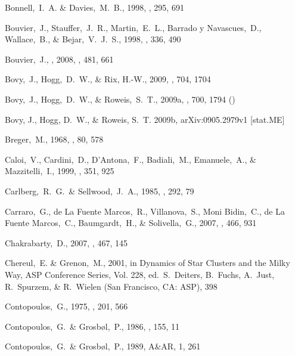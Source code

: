 \begin{thebibliography}{99}
  Bonnell,~I.~A. \& Davies,~M.~B., 1998,
  \mnras, 295, 691

  Bouvier,~J., Stauffer,~J.~R., Martin,~E.~L., Barrado y Navascues,~D., Wallace,~B., \& Bejar,~V.~J.~S., 1998,
  \aap, 336, 490

  Bouvier,~J., \etal, 2008,
  \aap, 481, 661

  Bovy,~J., Hogg,~D.~W., \& Rix, H.-W., 2009,
  \apj, 704, 1704

 Bovy,~J., Hogg,~D.~W.,
  \& Roweis,~S.~T., 2009a, \apj, 700, 1794 (\bhr)

{Bovy}, J., {Hogg}, D.~W., \& {Roweis}, S.~T. 2009b, {arXiv:0905.2979v1
[stat.ME]}

  Breger,~M., 1968, \pasp, 80, 578

  Caloi,~V., Cardini,~D., D'Antona,~F., Badiali,~M., Emanuele,~A., \& Mazzitelli,~I., 1999,
  \aap, 351, 925

  Carlberg,~R.~G.~\& Sellwood,~J.~A., 1985,
  \apj, 292, 79

  Carraro,~G., de La Fuente Marcos,~R., Villanova,~S., Moni Bidin,~C., de La Fuente Marcos,~C., Baumgardt,~H., \& Solivella,~G., 2007,
  \aap, 466, 931

  Chakrabarty,~D., 2007,
  \aap, 467, 145

  Chereul,~E. \& Grenon,~M., 2001, in Dynamics of Star Clusters and the
  Milky Way, ASP Conference Series, Vol. 228, ed.~S.~Deiters, B.~Fuchs,
  A.~Just, R.~Spurzem, \& R.~Wielen (San Francisco, CA: ASP), 398

  Contopoulos,~G., 1975,
  \apj, 201, 566

  Contopoulos,~G.~\& Grosb\o l,~P., 1986,
  \aap, 155, 11

  Contopoulos,~G.~\& Grosb\o l,~P., 1989,
  A\&AR, 1, 261


\end{thebibliography}
